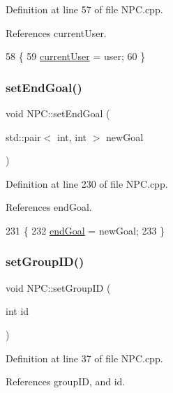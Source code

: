Definition at line 57 of file N\+P\+C.\+cpp.



References current\+User.


\begin{DoxyCode}
58 \{
59     \hyperlink{class_n_p_c_a944f970943002adc4f0c970b0200c011}{currentUser} = user;
60 \}
\end{DoxyCode}
\mbox{\label{class_n_p_c_aefc13625a35497cf6158c15692c52eda}} 
\subsubsection{\texorpdfstring{set\+End\+Goal()}{setEndGoal()}}
{\footnotesize\ttfamily void N\+P\+C\+::set\+End\+Goal (\begin{DoxyParamCaption}\item[{std\+::pair$<$ int, int $>$}]{new\+Goal }\end{DoxyParamCaption})}



Definition at line 230 of file N\+P\+C.\+cpp.



References end\+Goal.


\begin{DoxyCode}
231 \{
232     \hyperlink{class_n_p_c_ab2349a8d6757b61a73f87de9cba387d1}{endGoal} = newGoal;
233 \}
\end{DoxyCode}
\mbox{\label{class_n_p_c_aaa89e6f11f1bda185769ae321f345960}} 
\subsubsection{\texorpdfstring{set\+Group\+I\+D()}{setGroupID()}}
{\footnotesize\ttfamily void N\+P\+C\+::set\+Group\+ID (\begin{DoxyParamCaption}\item[{int}]{id }\end{DoxyParamCaption})}



Definition at line 37 of file N\+P\+C.\+cpp.



References group\+ID, and id.


